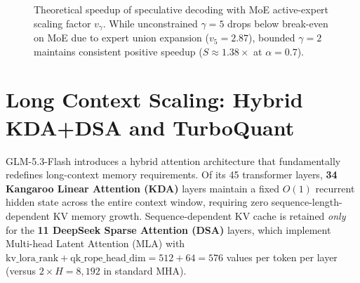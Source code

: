 \documentclass[11pt,a4paper]{article}
\begin{document}
\begin{figure}[ht!]
\centering
{}
\caption{Theoretical speedup of speculative decoding with MoE active-expert scaling factor $v_\gamma$. While unconstrained $\gamma=5$ drops below break-even on MoE due to expert union expansion ($v_5=2.87$), bounded $\gamma=2$ maintains consistent positive speedup ($S \approx 1.38\times$ at $\alpha=0.7$).}
\label{fig:spec_speedup}
\end{figure}

\section{Long Context Scaling: Hybrid KDA+DSA and TurboQuant}

GLM-5.3-Flash introduces a hybrid attention architecture that fundamentally redefines long-context memory requirements. Of its 45 transformer layers, \textbf{34 Kangaroo Linear Attention (KDA)} layers maintain a fixed $O(1)$ recurrent hidden state across the entire context window, requiring zero sequence-length-dependent KV memory growth. Sequence-dependent KV cache is retained \textit{only} for the \textbf{11 DeepSeek Sparse Attention (DSA)} layers, which implement Multi-head Latent Attention (MLA) with $\text{kv\_lora\_rank} + \text{qk\_rope\_head\_dim} = 512 + 64 = 576$ values per token per layer (versus $2 \times H = 8{,}192$ in standard MHA).
\end{document}
